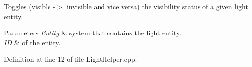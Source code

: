 Toggles (visible -\/$>$ invisible and vice versa) the visibility status of a given light entity. 


\begin{DoxyParams}{Parameters}
{\em Entity} & system that contains the light entity. \\
\hline
{\em ID} & of the entity. \\
\hline
\end{DoxyParams}


Definition at line 12 of file Light\+Helper.\+cpp.

